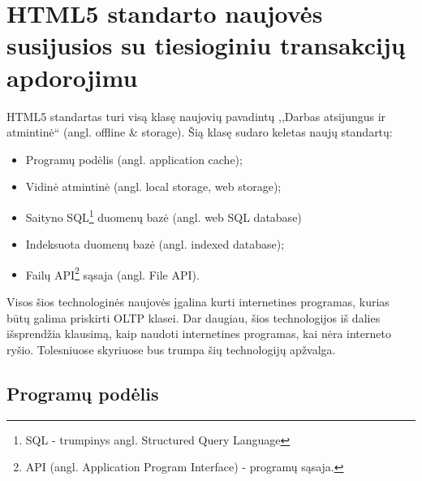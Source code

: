 \documentclass[12pt,a4paper,titlepage]{article}
\begin{document}
\section{HTML5 standarto naujovės susijusios su tiesioginiu transakcijų apdorojimu}

HTML5 standartas turi visą klasę naujovių pavadintų ,,Darbas atsijungus ir atmintinė`` (angl. offline \& storage). Šią klasę sudaro keletas naujų standartų: 
\begin{itemize}
  \item Programų podėlis (angl. application cache);
  \item Vidinė atmintinė (angl. local storage, web storage);
  \item Saityno SQL\footnote{SQL - trumpinys angl. Structured Query Language} duomenų bazė (angl. web SQL database)
  \item Indeksuota duomenų bazė (angl. indexed database);
  \item Failų API\footnote{API (angl. Application Program Interface) - programų sąsaja.} sąsaja (angl. File API).
\end{itemize}
Visos šios technologinės naujovės įgalina kurti internetines programas, kurias būtų galima priskirti OLTP klasei. Dar daugiau, šios technologijos iš dalies išsprendžia klausimą, kaip naudoti internetines programas, kai nėra interneto ryšio. Tolesniuose skyriuose bus trumpa šių technologijų apžvalga.

\subsection{Programų podėlis}
\end{document}
